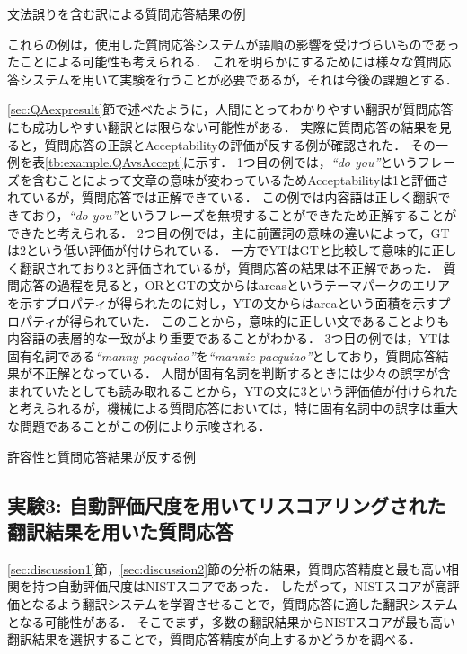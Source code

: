 \documentclass[japanese]{jnlp_1.4}
\begin{document}
\begin{table}[b]
\caption{{文法誤りを含む訳による質問応答結果の例}}
\label{tb:example.ms}

\end{table}

これらの例は，使用した質問応答システムが語順の影響を受けづらいものであったことによる可能性も考えられる．
これを明らかにするためには様々な質問応答システムを用いて実験を行うことが必要であるが，それは今後の課題とする．

{{\ref{sec:QAexpresult}}節で述べたように，人間にとってわかりやすい翻訳が質問応答にも成功しやすい翻訳とは限らない可能性がある．
実際に質問応答の結果を見ると，質問応答の正誤とAcceptabilityの評価が反する例が確認された．
その一例を表{\ref{tb:example.QAvsAccept}}に示す．
1つ目の例では，{\it ``do you''}というフレーズを含むことによって文章の意味が変わっているためAcceptabilityは1と評価されているが，質問応答では正解できている．
この例では内容語は正しく翻訳できており，{\it ``do you''}というフレーズを無視することができたため正解することができたと考えられる．
2つ目の例では，主に前置詞の意味の違いによって，GTは2という低い評価が付けられている．
一方でYTはGTと比較して意味的に正しく翻訳されており3と評価されているが，質問応答の結果は不正解であった．
質問応答の過程を見ると，ORとGTの文からはareasというテーマパークのエリアを示すプロパティが得られたのに対し，YTの文からはareaという面積を示すプロパティが得られていた．
このことから，意味的に正しい文であることよりも内容語の表層的な一致がより重要であることがわかる．
3つ目の例では，YTは固有名詞である{\it ``manny pacquiao''}を{\it ``mannie pacquiao''}としており，質問応答結果が不正解となっている．
人間が固有名詞を判断するときには少々の誤字が含まれていたとしても読み取れることから，YTの文に3という評価値が付けられたと考えられるが，機械による質問応答においては，特に固有名詞中の誤字は重大な問題であることがこの例により示唆される．}

\begin{table}[t]
\caption{{許容性と質問応答結果が反する例}}
\label{tb:example.QAvsAccept}

\end{table}


\subsection{実験3: 自動評価尺度を用いてリスコアリングされた翻訳結果を用いた質問応答}
\label{sec:nbestselect}

\ref{sec:discussion1}節，\ref{sec:discussion2}節の分析の結果，質問応答精度と最も高い相関を持つ自動評価尺度はNISTスコアであった．
したがって，NISTスコアが高評価となるよう翻訳システムを学習させることで，質問応答に適した翻訳システムとなる可能性がある．
そこでまず，多数の翻訳結果からNISTスコアが最も高い翻訳結果を選択することで，質問応答精度が向上するかどうかを調べる．
\end{document}

